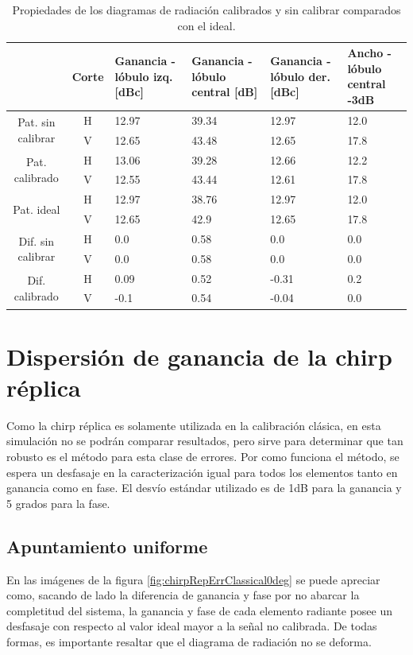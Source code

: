 \begin{table}[H]
  \footnotesize
  \centering
  \begin{tabular}{|c|c|p{2cm}|p{2.5cm}|p{2.5cm}|p{2.5cm}|}
    \cline{2-6}
    \multicolumn{1}{c|}{} & Corte & Ganancia - lóbulo izq. [dBc] & Ganancia - lóbulo central [dB] &
    Ganancia - lóbulo der. [dBc] & Ancho - lóbulo central -3dB \tabularnewline\hline
    \multirow{2}{2cm}{Pat. sin calibrar} & H & 12.97 & 39.34 & 12.97 & 12.0 \tabularnewline\cline{2-6}
     & V & 12.65 & 43.48 & 12.65 & 17.8 \tabularnewline\hline
    \multirow{2}{2cm}{Pat. calibrado} & H & 13.06 & 39.28 & 12.66 & 12.2 \tabularnewline\cline{2-6}
     & V & 12.55 & 43.44 & 12.61 & 17.8 \tabularnewline\hline
    \multirow{2}{2cm}{Pat. ideal} & H & 12.97 & 38.76 & 12.97 & 12.0 \tabularnewline\cline{2-6}
     & V & 12.65 & 42.9 & 12.65 & 17.8 \tabularnewline\hline
    \multirow{2}{2cm}{Dif. sin calibrar} & H & 0.0 & 0.58 & 0.0 & 0.0\tabularnewline\cline{2-6}
     & V & 0.0 & 0.58 & 0.0 & 0.0 \tabularnewline\hline
    \multirow{2}{2cm}{Dif. calibrado} & H & 0.09 & 0.52 & -0.31 & 0.2 \tabularnewline\cline{2-6}
     & V & -0.1 & 0.54 & -0.04 & 0.0 \tabularnewline\hline
  \end{tabular}
  \caption{Propiedades de los diagramas de radiación calibrados y sin calibrar comparados con el ideal.}
  \label{tab:chirpErrMutual10degRow}
\end{table}


\section{Dispersión de ganancia de la chirp réplica}

Como la chirp réplica es solamente utilizada en la calibración clásica, en esta simulación no se podrán comparar 
resultados, pero sirve para determinar que tan robusto es el método para esta clase de errores. Por como funciona el método, 
se espera un desfasaje en la caracterización igual para todos los elementos tanto en ganancia como en fase. El desvío estándar
utilizado es de 1dB para la ganancia y 5 grados para la fase.

\subsection{Apuntamiento uniforme}

En las imágenes de la figura \ref{fig:chirpRepErrClassical0deg} se puede apreciar como, sacando de lado la diferencia de 
ganancia y fase por no abarcar la completitud del sistema, la ganancia y fase de cada elemento radiante posee un desfasaje con 
respecto al valor ideal mayor a la señal no calibrada. De todas formas, es importante resaltar que el diagrama de radiación no 
se deforma. 

